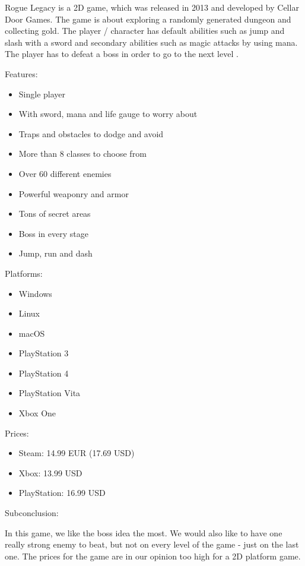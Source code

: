 \documentclass[12p]{article}
\begin{document}
Rogue Legacy is a 2D game, which was released in 2013 and developed by Cellar Door Games. The game is about exploring a randomly generated dungeon and collecting gold. The player / character has default abilities such as jump and slash with a sword and secondary abilities such as magic attacks by using mana. The player has to defeat a boss in order to go to the next level \cite{RogueLegacyReview}.

Features: \cite{RogueLegacySteam}

\begin{itemize}
 \item Single player
 \item With sword, mana and life gauge to worry about
 \item Traps and obstacles to dodge and avoid
 \item More than 8 classes to choose from
 \item Over 60 different enemies
 \item Powerful weaponry and armor
 \item Tons of secret areas
 \item Boss in every stage
 \item Jump, run and dash
\end{itemize}

\newpage

Platforms: \cite{RogueLegacyWiki}

\begin{itemize}
  \item Windows
  \item Linux
  \item macOS
  \item PlayStation 3
  \item PlayStation 4
  \item PlayStation Vita
  \item Xbox One
\end{itemize}

Prices:

\begin{itemize}
 \item Steam: 14.99 EUR (17.69 USD)
 \item Xbox: 13.99 USD
 \item PlayStation: 16.99 USD
\end{itemize}

Subconclusion:

In this game, we like the boss idea the most. We would also like to have one really strong enemy to beat, but not on every level of the game - just on the last one. The prices for the game are in our opinion too high for a 2D platform game.
\end{document}
